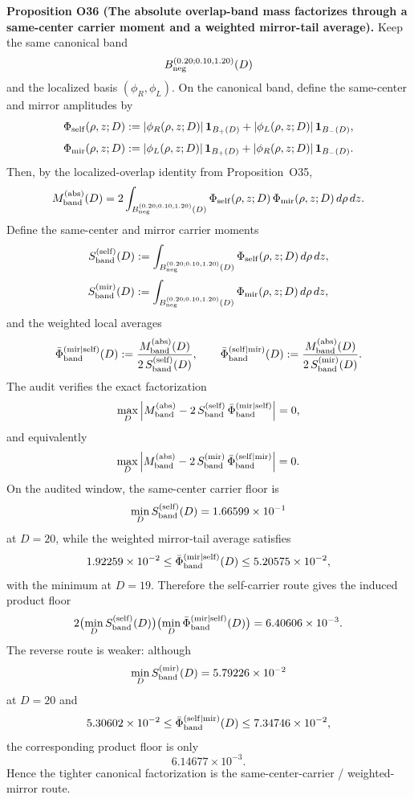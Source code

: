 \documentclass[aps,prd,onecolumn,notitlepage,nofootinbib,superscriptaddress,11pt,floatfix]{revtex4-2}
\begin{document}
\medskip\noindent\textbf{Proposition O36 (The absolute overlap-band mass factorizes through a same-center carrier moment and a weighted mirror-tail average).}
Keep the same canonical band
\[
B_{\rm neg}^{(0.20;0.10,1.20)}(D)
\]
and the localized basis \((\phi_R,\phi_L)\). On the canonical band, define the same-center and mirror amplitudes by
\[
\Phi_{\rm self}(\rho,z;D)
:=
|\phi_R(\rho,z;D)|\,\mathbf 1_{B_+(D)}
+
|\phi_L(\rho,z;D)|\,\mathbf 1_{B_-(D)},
\]
\[
\Phi_{\rm mir}(\rho,z;D)
:=
|\phi_L(\rho,z;D)|\,\mathbf 1_{B_+(D)}
+
|\phi_R(\rho,z;D)|\,\mathbf 1_{B_-(D)}.
\]
Then, by the localized-overlap identity from Proposition~O35,
\[
M_{\rm band}^{\rm(abs)}(D)
=
2\int_{B_{\rm neg}^{(0.20;0.10,1.20)}(D)}
\Phi_{\rm self}(\rho,z;D)\,\Phi_{\rm mir}(\rho,z;D)\,d\rho\,dz.
\]
Define the same-center and mirror carrier moments
\[
S_{\rm band}^{\rm(self)}(D)
:=
\int_{B_{\rm neg}^{(0.20;0.10,1.20)}(D)}
\Phi_{\rm self}(\rho,z;D)\,d\rho\,dz,
\]
\[
S_{\rm band}^{\rm(mir)}(D)
:=
\int_{B_{\rm neg}^{(0.20;0.10,1.20)}(D)}
\Phi_{\rm mir}(\rho,z;D)\,d\rho\,dz,
\]
and the weighted local averages
\[
\bar\Phi_{\rm band}^{\rm(mir|self)}(D)
:=
\frac{M_{\rm band}^{\rm(abs)}(D)}{2\,S_{\rm band}^{\rm(self)}(D)},
\qquad
\bar\Phi_{\rm band}^{\rm(self|mir)}(D)
:=
\frac{M_{\rm band}^{\rm(abs)}(D)}{2\,S_{\rm band}^{\rm(mir)}(D)}.
\]
The audit
verifies the exact factorization
\[
\max_D\left|M_{\rm band}^{\rm(abs)}-2\,S_{\rm band}^{\rm(self)}\,\bar\Phi_{\rm band}^{\rm(mir|self)}\right|
=
0,
\]
and equivalently
\[
\max_D\left|M_{\rm band}^{\rm(abs)}-2\,S_{\rm band}^{\rm(mir)}\,\bar\Phi_{\rm band}^{\rm(self|mir)}\right|
=
0.
\]
On the audited window, the same-center carrier floor is
\[
\min_D S_{\rm band}^{\rm(self)}(D)
=
1.66599\times10^{-1}
\]
at \(D=20\), while the weighted mirror-tail average satisfies
\[
1.92259\times10^{-2}
\le
\bar\Phi_{\rm band}^{\rm(mir|self)}(D)
\le
5.20575\times10^{-2},
\]
with the minimum at \(D=19\). Therefore the self-carrier route gives the induced product floor
\[
2\bigl(\min_D S_{\rm band}^{\rm(self)}(D)\bigr)
\bigl(\min_D \bar\Phi_{\rm band}^{\rm(mir|self)}(D)\bigr)
=
6.40606\times10^{-3}.
\]
The reverse route is weaker: although
\[
\min_D S_{\rm band}^{\rm(mir)}(D)
=
5.79226\times10^{-2}
\]
at \(D=20\) and
\[
5.30602\times10^{-2}
\le
\bar\Phi_{\rm band}^{\rm(self|mir)}(D)
\le
7.34746\times10^{-2},
\]
the corresponding product floor is only
\[
6.14677\times10^{-3}.
\]
Hence the tighter canonical factorization is the same-center-carrier / weighted-mirror route.
\end{document}
